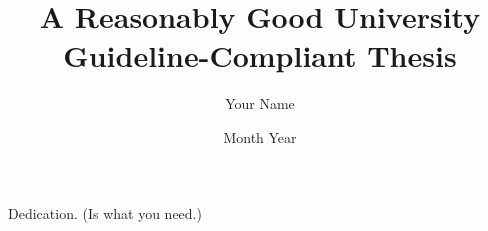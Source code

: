 \documentclass[oneside,nogutter,hidelinks]{glasgowthesis}
\begin{document}
\pagestyle{empty}

\title{A Reasonably Good University Guideline-Compliant Thesis}
\author{Your Name}
\date{Month Year}

\maketitle

\cleardoublepage



\newpage


\newpage


\cleardoublepage
\vspace*{1.75in}
\begin{flushright} Dedication. (Is what you need.)\end{flushright}








\tableofcontents
\listoftables
\listoffigures
\cleardoublepage
\pagestyle{fancy}
\setcounter{page}{1}
\end{document}
